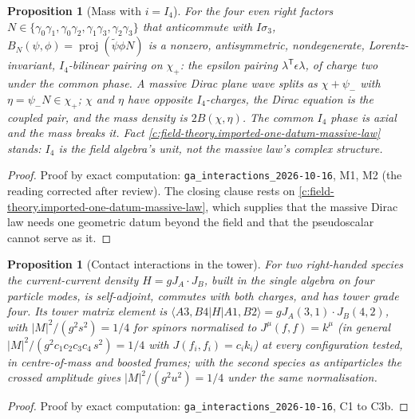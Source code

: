 \documentclass[11pt]{article}
\newtheorem{proposition}[theorem]{Proposition}
\theoremstyle{definition}
\theoremstyle{plain}
\providecommand{\IS}{}\renewcommand{\IS}{I\sigma_3}
\providecommand{\proj}{}\renewcommand{\proj}{\operatorname{proj}}
\begin{document}
\begin{proposition}[Mass with $i = I_4$]\label{c:field-theory.mass}
For the four even right factors $N \in \{\gamma_0\gamma_1, \gamma_0\gamma_2, \gamma_1\gamma_3, \gamma_2\gamma_3\}$ that anticommute with $\IS$, $B_N(\psi, \phi) = \proj(\tilde\psi\phi N)$ is a nonzero, antisymmetric, nondegenerate, Lorentz-invariant, $I_4$-bilinear pairing on $\chi_+$: the epsilon pairing $\lambda^{\mathsf T}\epsilon\lambda$, of charge two under the common phase. A massive Dirac plane wave splits as $\chi + \psi_-$ with $\eta = \psi_-N \in \chi_+$; $\chi$ and $\eta$ have opposite $I_4$-charges, the Dirac equation is the coupled pair, and the mass density is $2B(\chi, \eta)$. The common $I_4$ phase is axial and the mass breaks it. Fact \ref{c:field-theory.imported-one-datum-massive-law} stands: $I_4$ is the field algebra's unit, not the massive law's complex structure.
\end{proposition}
\begin{proof}
Proof by exact computation: \texttt{ga\_interactions\_2026-10-16}, M1, M2 (the reading corrected after review). The closing clause rests on \ref{c:field-theory.imported-one-datum-massive-law}, which supplies that the massive Dirac law needs one geometric datum beyond the field and that the pseudoscalar cannot serve as it.

\end{proof}

\begin{proposition}[Contact interactions in the tower]\label{c:field-theory.contact-interactions-tower}
For two right-handed species the current-current density $H = g J_A\cdot J_B$, built in the single algebra on four particle modes, is self-adjoint, commutes with both charges, and has tower grade four. Its tower matrix element is $\langle A3, B4|H|A1, B2\rangle = g J_A(3,1)\cdot J_B(4,2)$, with $|M|^2/(g^2 s^2) = 1/4$ for spinors normalised to $J^{\mu}(f, f) = k^{\mu}$ (in general $|M|^2/(g^2 c_1c_2c_3c_4\,s^2) = 1/4$ with $J(f_i, f_i) = c_i k_i$) at every configuration tested, in centre-of-mass and boosted frames; with the second species as antiparticles the crossed amplitude gives $|M|^2/(g^2 u^2) = 1/4$ under the same normalisation.
\end{proposition}
\begin{proof}
Proof by exact computation: \texttt{ga\_interactions\_2026-10-16}, C1 to C3b.

\end{proof}
\end{document}
